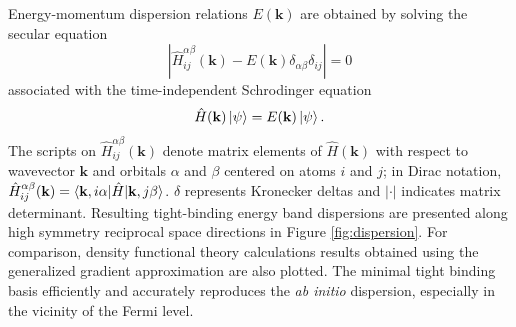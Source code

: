 \documentclass[twocolumn,showpacs,preprintnumbers,superscriptaddress,prb,floatfix,aps,10pt]{revtex4-1}
\renewcommand{\vec}[1]{\ensuremath{\mathbf{#1}}}
\newcommand*{\ham}{\hat{H}}
\begin{document}
Energy-momentum dispersion relations $E(\vec{k})$ are obtained by solving the secular equation
\begin{equation}
\label{eq:secular}
\left| \ham^{\alpha\beta}_{ij}(\vec{k}) - E(\vec{k})\delta_{\alpha\beta}\delta_{ij} \right| = 0
\end{equation}
%
associated with the time-independent Schrodinger equation 
%
\begin{equation}
\label{eq:schrodinger}
\hat{H}(\vec{k}) \ket{\psi} = E(\vec{k}) \ket{\psi}.
\end{equation}
%
The scripts on $\ham^{\alpha\beta}_{ij}(\vec{k})$ denote matrix elements of $\ham(\vec{k})$ with respect to wavevector $\vec{k}$ and orbitals $\alpha$ and $\beta$ centered on atoms $i$ and $j$; in Dirac notation, $\ham^{\alpha\beta}_{ij}(\vec{k}) = \braket{\vec{k},i\alpha | \ham | \vec{k},j\beta}$. $\delta$ represents Kronecker deltas and $|\cdot |$ indicates matrix determinant. Resulting tight-binding energy band dispersions are presented along high symmetry reciprocal space directions in Figure \ref{fig:dispersion}. For comparison, density functional theory calculations results obtained using the generalized gradient approximation are also plotted. The minimal tight binding basis efficiently and accurately reproduces the \emph{ab initio} dispersion, especially in the vicinity of the Fermi level. 
\end{document}
